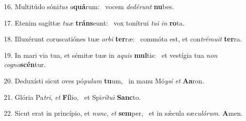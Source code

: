 16. Multitúdo sóni\textit{tus} \textit{a}\textbf{quá}rum: \ast\  vocem \textit{de}\textit{dé}\textit{runt} \textbf{nu}bes.\

17. Etenim sagíttæ \textit{tu}\textit{æ} \textbf{tráns}eunt: \ast\  vox tonítrui \textit{tu}\textit{i} \textit{in} \textbf{ro}ta.\

18. Illuxérunt coruscatiónes tuæ \textit{or}\textit{bi} \textbf{ter}ræ: \ast\  commóta est, et con\textit{tré}\textit{mu}\textit{it} \textbf{ter}ra.\

19. In mari via tua, et sémitæ tuæ in \textit{a}\textit{quis} \textbf{mul}tis: \ast\  et vestígia tua \textit{non} \textit{co}\textit{gno}\textbf{scén}tur.\

20. Deduxísti sicut oves pó\textit{pu}\textit{lum} \textbf{tu}um, \ast\  in manu Mó\textit{y}\textit{si} \textit{et} \textbf{A}\textbf{a}ron.\

21. Glória Pa\textit{tri}, \textit{et} \textbf{Fí}lio, \ast\  et Spi\textit{rí}\textit{tu}\textit{i} \textbf{Sanc}to.\

22. Sicut erat in princípio, et \textit{nunc}, \textit{et} \textbf{sem}per, \ast\  et in sǽcula sæ\textit{cu}\textit{ló}\textit{rum}. \textbf{A}men.\

